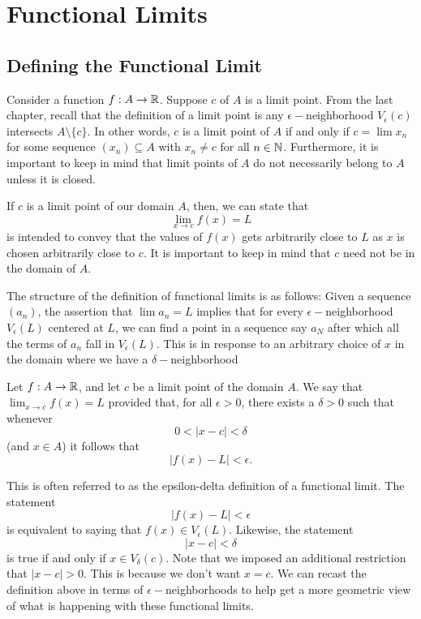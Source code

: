 \section{Functional Limits}


\subsection{Defining the Functional Limit}
Consider a function \( f: A \to \mathbb{R}  \). Suppose \( c  \) of \( A  \) is a limit point. From the last chapter, recall that the definition of a limit point is any \( \epsilon - \)neighborhood \( V_{\epsilon }(c) \) intersects \( A \setminus \{ c \}  \). In other words, \( c  \) is a limit point of \(  A \) if and only if \( c = \lim x_n \) for some sequence \( (x_n) \subseteq A  \) with \( x_n \neq c  \) for all \( n \in \mathbb{N}  \). Furthermore, it is important to keep in mind that limit points of \(  A \) do not necessarily belong to \( A  \) unless it is closed. 

If \( c  \) is a limit point of our domain \( A  \), then, we can state that 
\[ \lim_{x \to c }f(x) = L  \] is intended to convey that the values of \( f(x) \) gets arbitrarily close to \( L \) as \( x  \) is chosen arbitrarily close to \( c \). It is important to keep in mind that \( c \) need not be in the domain of \( A  \).

The structure of the definition of functional limits is as follows:
Given a sequence \( (a_n) \), the assertion that \( \lim a_n = L   \) implies that for every \( \epsilon - \)neighborhood \( V_{\epsilon }(L) \) centered at \( L \), we can find a point in a sequence say \( a_N \) after which all the terms of \( a_n \) fall in \( V_{\epsilon }(L) \). This is in response to an arbitrary choice of \( x \) in the domain where we have a \( \delta- \)neighborhood

\begin{definition}
        Let \( f: A \to \mathbb{R}  \), and let \( c \) be a limit point of the domain \( A  \). We say that \( \lim_{ x \to c } f(x) = L   \) provided that, for all \( \epsilon > 0  \), there exists a \( \delta > 0  \) such that whenever 
        \[ 0 <  | x - c  | < \delta  \] (and \( x \in A  \)) it follows that 
        \[ | f(x) - L  | < \epsilon.  \]
    \end{definition}

This is often referred to as the epsilon-delta definition of a functional limit. The statement
\[ | f(x) - L  | < \epsilon  \]
is equivalent to saying that \( f(x) \in V_{\epsilon }(L) \). Likewise, the statement 
\[  | x - c  | < \delta \] is true if and only if \( x \in V_{\delta}(c) \). Note that we imposed an additional restriction that \( | x - c  | > 0  \). This is because we don't want \( x = c  \). We can recast the definition above in terms of \( \epsilon- \)neighborhoods to help get a more geometric view of what is happening with these functional limits.

